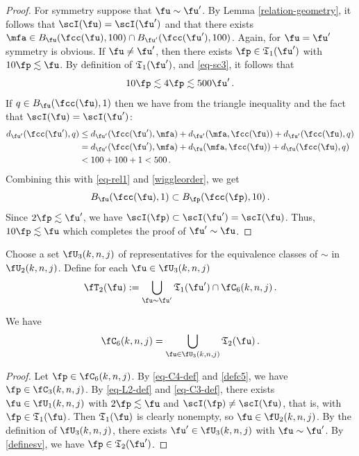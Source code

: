 \begin{proof}
    For symmetry suppose that $\fu \sim \fu'$. By Lemma \eqref{relation-geometry}, it follows that $\scI(\fu) = \scI(\fu')$ and that there exists $\mfa \in B_{\fu}(\fcc(\fu), 100) \cap B_{\fu'}(\fcc(\fu'), 100)$. Again, for $\fu = \fu'$ symmetry is obvious. If $\fu \ne \fu'$, then there exists $\fp \in \mathfrak{T}_1(\fu')$ with $10\fp\lesssim \fu$. By definition of $\mathfrak{T}_1(\fu')$,  and \eqref{eq-sc3}, it follows that
    \begin{equation}
        \label{eq-rel1}
        10\fp \lesssim 4\fp \lesssim 500 \fu'\,.
    \end{equation}
    If $q \in B_{\fu}(\fcc(\fu),1)$ then we have from the triangle inequality and the fact that $\scI(\fu) = \scI(\fu')$:
    \begin{align*}
        d_{\fu'}(\fcc(\fu'), q) &\le d_{\fu'}(\fcc(\fu'), \mfa) + d_{\fu'}(\mfa, \fcc(\fu)) + d_{\fu'}(\fcc(\fu), q)\\
        &= d_{\fu'}(\fcc(\fu'), \mfa) + d_{\fu}(\mfa, \fcc(\fu)) + d_{\fu}(\fcc(\fu), q)\\
        &< 100 + 100 + 1 < 500\,.
    \end{align*}
    Combining this with \eqref{eq-rel1} and \eqref{wiggleorder}, we get
    \begin{equation*}
     B_{\fu}(\fcc(\fu), 1) \subset B_{\fp}(\fcc(\fp), 10)\, .
    \end{equation*}
    Since $2\fp \lesssim \fu'$, we have $\scI(\fp) \subset \scI(\fu') = \scI(\fu)$. Thus, $10\fp \lesssim \fu$ which completes the proof of $\fu' \sim \fu$.
\end{proof}

Choose a set $\fU_3(k,n,j)$ of representatives for the equivalence
classes of $\sim$ in $\fU_2(k,n,j)$.
Define for each $\fu\in \fU_3(k,n,j)$
\begin{equation}\label{definesv}
\fT_2(\fu):=
   \bigcup_{\fu\sim \fu'}\mathfrak{T}_1(\fu')\cap \fC_6(k,n,j)\, .
\end{equation}

\begin{lemma}[C6 forest]
\label{C6-forest}
\leanok
{}
We have
\begin{equation}
    \fC_6(k,n,j)=\bigcup_{\fu\in \fU_3(k,n,j)}\mathfrak{T}_2(\fu)\, .
\end{equation}
\end{lemma}
\begin{proof}
    Let $\fp \in \fC_6(k,n,j)$.
    By \eqref{eq-C4-def} and \eqref{defc5}, we have $\fp \in \fC_3(k,n,j)$. By \eqref{eq-L2-def} and \eqref{eq-C3-def}, there exists $\fu \in \fU_1(k,n,j)$ with $2\fp \lesssim \fu$ and $\scI(\fp) \ne \scI(\fu)$, that is, with $\fp \in \mathfrak{T}_1(\fu)$. Then $\mathfrak{T}_1(\fu)$ is clearly nonempty, so $\fu \in \fU_2(k,n,j)$. By the definition of $\fU_3(k,n,j)$, there exists $\fu' \in \fU_3(k,n,j)$ with $\fu \sim \fu'$. By \eqref{definesv}, we have $\fp \in \mathfrak{T}_2(\fu')$.
\end{proof}

